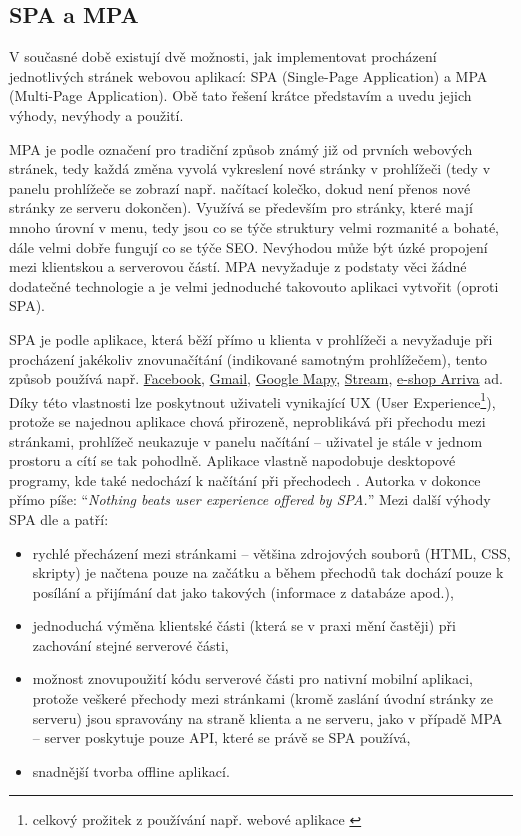         \subsection{SPA a MPA}\label{spampa}
        V současné době existují dvě možnosti, jak implementovat procházení jednotlivých stránek webovou aplikací: SPA (Single-Page Application) a MPA (Multi-Page Application). Obě tato řešení krátce představím a uvedu jejich výhody, nevýhody a použití.
        
        MPA je podle \cite{spa1} označení pro tradiční způsob známý již od prvních webových stránek, tedy každá změna vyvolá vykreslení nové stránky v prohlížeči (tedy v panelu prohlížeče se zobrazí např. načítací kolečko, dokud není přenos nové stránky ze serveru dokončen). Využívá se především pro stránky, které mají mnoho úrovní v menu, tedy jsou co se týče struktury velmi rozmanité a bohaté, dále velmi dobře fungují co se týče SEO. Nevýhodou může být úzké propojení mezi klientskou a serverovou částí. MPA nevyžaduje z podstaty věci žádné dodatečné technologie a je velmi jednoduché takovouto aplikaci vytvořit (oproti SPA).
        
        SPA je podle \cite{spa1} aplikace, která běží přímo u klienta v prohlížeči a nevyžaduje při procházení jakékoliv znovunačítání (indikované samotným prohlížečem), tento způsob používá např. \href{https://www.facebook.com/}{Facebook}, \href{https://mail.google.com/}{Gmail}, \href{https://www.google.com/maps}{Google Mapy}, \href{https://www.stream.cz/}{Stream}, \href{https://jizdenky.arriva.cz/}{e-shop Arriva} ad. Díky této vlastnosti lze poskytnout uživateli vynikající UX (User Experience\footnote{celkový prožitek z používání např. webové aplikace \cite{ux}}), protože se najednou aplikace chová přirozeně, neproblikává při přechodu mezi stránkami, prohlížeč neukazuje v panelu načítání -- uživatel je stále v jednom prostoru a cítí se tak pohodlně. Aplikace vlastně napodobuje desktopové programy, kde také nedochází k načítání při přechodech \cite{spa2}. Autorka v \cite{spa2} dokonce přímo píše: \enquote{\textit{Nothing beats user experience offered by SPA.}} Mezi další výhody SPA dle \cite{spa1} a \cite{spa2} patří:
        
        \begin{itemize}
            \item rychlé přecházení mezi stránkami -- většina zdrojových souborů (HTML, CSS, skripty) je načtena pouze na začátku a během přechodů tak dochází pouze k posílání a přijímání dat jako takových (informace z databáze apod.),
            \item jednoduchá výměna klientské části (která se v praxi mění častěji) při zachování stejné serverové části,
            \item možnost znovupoužití kódu serverové části pro nativní mobilní aplikaci, protože veškeré přechody mezi stránkami (kromě zaslání úvodní stránky ze serveru) jsou spravovány na straně klienta a ne serveru, jako v případě MPA -- server poskytuje pouze API, které se právě se SPA používá,
            \item snadnější tvorba offline aplikací.
        \end{itemize}
        
